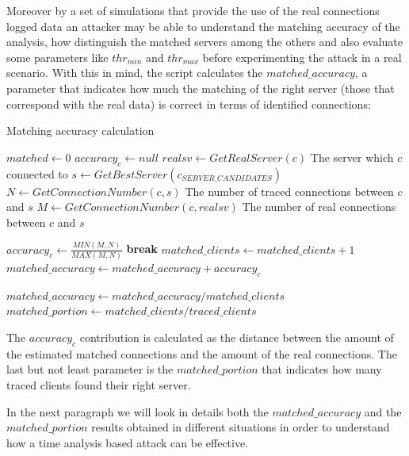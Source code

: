 Moreover by a set of simulations
that provide the use of the real connections logged data an attacker
may be able to understand the matching accuracy of the analysis, how distinguish the
matched servers among the others and also evaluate some
parameters like $thr_{min}$ and $thr_{max}$ before 
experimenting the attack in a real scenario. 
With this in mind, the script
calculates the $matched\_accuracy$, a parameter that indicates how much
the matching of the right server (those that correspond with the real
data) is correct in terms of identified
connections:

\begin{algorithm}[H]
\caption{Matching accuracy calculation}
\begin{algorithmic}
\State $matched \gets 0$
	\State $accuracy_c \gets null$
	\State $realsv \gets GetRealServer(c)$ 
	{\footnotesize \Comment The server which $c$ connected to}
	\State $s \gets GetBestServer(c_{SERVER\_CANDIDATES})$
		\State $N \gets GetConnectionNumber(c, s) $ 
		{\footnotesize \Comment The number of traced connections between $c$ and $s$}
		\State $M \gets GetConnectionNumber(c, realsv)$ 
		{\footnotesize \Comment The number of real connections between $c$ and $s$}

		\State $accuracy_c \gets \frac{ MIN(M, N)}{MAX(M, N)}$
	\State \textbf{break}
	\EndIf
		\State $matched\_clients \gets matched\_clients + 1$
		\State $matched\_accuracy \gets matched\_accuracy + accuracy_c$
	\EndIf	
\EndFor

\State $matched\_accuracy \gets matched\_accuracy / matched\_clients$
\State $matched\_portion \gets matched\_clients / traced\_clients$

\end{algorithmic}
\label{alg:maccuracy}
\end{algorithm}
 
The $accuracy_c$ contribution is calculated as the distance between the 
amount of the estimated matched connections
and the amount of the real connections.
The last but not least parameter is the $matched\_portion$ that indicates
how many traced clients found their right server. 


In the next paragraph we will look in details both the
$matched\_accuracy$ and the
$matched\_portion$
results obtained in different situations in order to understand how a
time analysis based attack can be effective.

